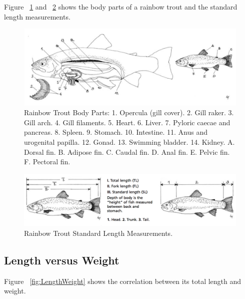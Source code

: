 Figure ~\ref{fig:BodyParts} and ~\ref{fig:LengthMeasurements} shows the body parts of a rainbow trout and the standard length measurements.



\begin{figure}[H]
  \centering
   \includegraphics[scale = 0.5]{images/BodyParts.png}
    \caption{Rainbow Trout Body Parts: 
  1. Opercula (gill cover). 2. Gill raker. 3. Gill arch. 4. Gill filaments. 5. Heart. 6. Liver. 7. Pyloric caecae and pancreas. 8. Spleen. 9. Stomach. 10. Intestine. 11. Anus and urogenital papilla. 12. Gonad. 13. Swimming bladder. 14. Kidney. A. Dorsal fin. B. Adipose fin. C. Caudal fin. D. Anal fin. E. Pelvic fin. F. Pectoral fin.}
   \label{fig:BodyParts}
\end{figure}

\begin{figure}[H]
  \centering
   \includegraphics[scale = 0.6]{images/LengthMeasurements.png}
    \caption{Rainbow Trout Standard Length Measurements.}
   \label{fig:LengthMeasurements}
\end{figure}


\subsection{Length versus Weight}

Figure ~\ref{fig:LengthWeight} shows the correlation between its total length and weight.

